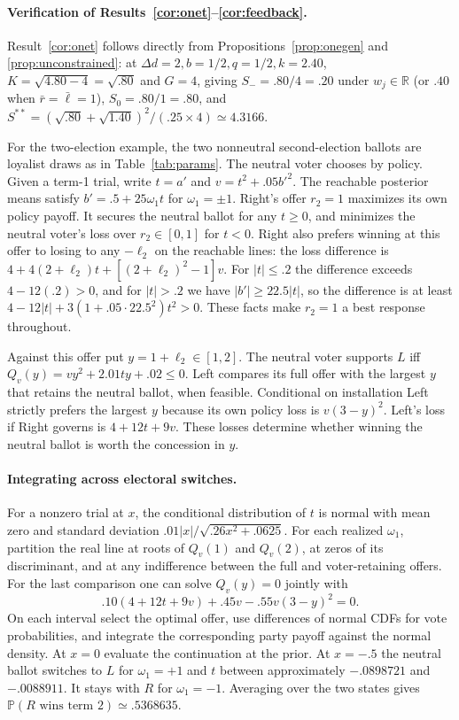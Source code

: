 \documentclass[11pt,letterpaper]{article}
\newcommand{\Prb}{\mathbb P}
\newcommand{\Dd}{\Delta d}
\begin{document}
\paragraph{Verification of Results~\ref{cor:onet}--\ref{cor:feedback}.}
Result~\ref{cor:onet} follows directly from Propositions~\ref{prop:onegen} and \ref{prop:unconstrained}: at $\Dd=2,b=1/2,q=1/2,k=2.40$, $K=\sqrt{4.80-4}=\sqrt{.80}$ and $G=4$, giving $S_-=.80/4=.20$ under $w_j\in\mathbb R$ (or $.40$ when $\bar r=\bar\ell=1$), $S_0=.80/1=.80$, and $S^{**}=(\sqrt{.80}+\sqrt{1.40})^2/(.25\times 4)\simeq 4.3166$.

For the two-election example, the two nonneutral second-election ballots are loyalist draws as in Table~\ref{tab:params}. The neutral voter chooses by policy. Given a term-1 trial, write $t=a'$ and $v=t^2+.05b'^2$. The reachable posterior means satisfy $b'=.5+25\omega_1 t$ for $\omega_1=\pm1$. Right's offer $r_2=1$ maximizes its own policy payoff. It secures the neutral ballot for any $t\ge0$, and minimizes the neutral voter's loss over $r_2\in[0,1]$ for $t<0$. Right also prefers winning at this offer to losing to any $-\ell_2$ on the reachable lines: the loss difference is $4+4(2+\ell_2)t+[(2+\ell_2)^2-1]v$. For $|t|\le .2$ the difference exceeds $4-12(.2)>0$, and for $|t|>.2$ we have $|b'|\ge22.5|t|$, so the difference is at least $4-12|t|+3(1+.05\cdot22.5^2)t^2>0$. These facts make $r_2=1$ a best response throughout.

Against this offer put $y=1+\ell_2\in[1,2]$. The neutral voter supports $L$ iff $Q_v(y)=v y^2+2.01t y+.02\le0$. Left compares its full offer with the largest $y$ that retains the neutral ballot, when feasible. Conditional on installation Left strictly prefers the largest $y$ because its own policy loss is $v(3-y)^2$. Left's loss if Right governs is $4+12t+9v$. These losses determine whether winning the neutral ballot is worth the concession in $y$.

\paragraph{Integrating across electoral switches.}
For a nonzero trial at $x$, the conditional distribution of $t$ is normal with mean zero and standard deviation $.01|x|/\sqrt{.26x^2+.0625}$. For each realized $\omega_1$, partition the real line at roots of $Q_v(1)$ and $Q_v(2)$, at zeros of its discriminant, and at any indifference between the full and voter-retaining offers. For the last comparison one can solve $Q_v(y)=0$ jointly with
\[
 .10(4+12t+9v)+.45v-.55v(3-y)^2=0 .
\]
On each interval select the optimal offer, use differences of normal CDFs for vote probabilities, and integrate the corresponding party payoff against the normal density. At $x=0$ evaluate the continuation at the prior. At $x=-.5$ the neutral ballot switches to $L$ for $\omega_1=+1$ and $t$ between approximately $-.0898721$ and $-.0088911$. It stays with $R$ for $\omega_1=-1$. Averaging over the two states gives $\Prb(R\text{ wins term }2)\simeq .5368635$.
\end{document}
